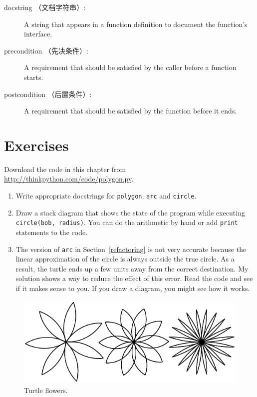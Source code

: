 \documentclass[10pt]{book}
\begin{document}
\begin{CJK}{UTF8}{gbsn}
\begin{description}
\item[docstring （文档字符串）:]  A string that appears in a function definition
to document the function's interface.

\item[precondition （先决条件）:] A requirement that should be satisfied by
the caller before a function starts.

\item[postcondition （后置条件）:] A requirement that should be satisfied by
the function before it ends.

\end{description}


\section{Exercises}

\begin{exercise}

Download the code in this chapter from
\url{http://thinkpython.com/code/polygon.py}.

\begin{enumerate}

\item Write appropriate docstrings for {\tt polygon}, {\tt arc} and
{\tt circle}.

\item Draw a stack diagram that shows the state of the program
while executing {\tt circle(bob, radius)}.  You can do the
arithmetic by hand or add {\tt print} statements to the code.

\item The version of {\tt arc} in Section~\ref{refactoring} is not
very accurate because the linear approximation of the
circle is always outside the true circle.  As a result,
the turtle ends up a few units away from the correct
destination. My solution shows a way to reduce
the effect of this error.  Read the code and see if it makes
sense to you.  If you draw a diagram, you might see how it works.

\end{enumerate}

\end{exercise}

\begin{figure}
\centerline
{\includegraphics[scale=0.8]{figs/flowers.pdf}}
\caption{Turtle flowers.}
\label{fig.flowers}
\end{figure}


\end{CJK}
\end{document}
